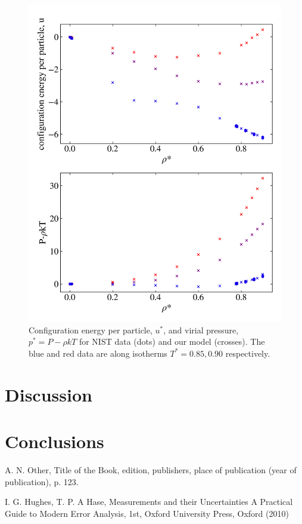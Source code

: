 \documentclass[10pt, twocolumn]{revtex4}    %
\begin{document}
\begin{figure}
	\includegraphics[width=\linewidth]{figures/finalResults1.png}
	\caption{Configuration energy per particle, $u^*$, and virial pressure, $p^{*} = P - \rho{}kT$ for NIST data (dots) and our model (crosses). The blue and red data are along isotherms $T^{*} = 0.85, 0.90$ respectively.}
	\label{fig:finalResults}
\end{figure}

\section{Discussion} \label{s:analysis}


\section{Conclusions} \label{s:conclusions}

\begin{thebibliography}{}

 A. N. Other, Title of the Book, edition, publishers, place of publication (year of publication), p. 123.   %

I. G. Hughes, T. P. A Hase, Measurements and their Uncertainties A Practical Guide to Modern Error Analysis, 1st, Oxford University Press, Oxford (2010)

\end{thebibliography} 
\end{document}
